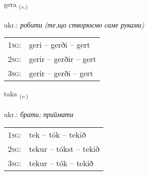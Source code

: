 \documentclass[frontgrid, backgrid]{flacards}\usepackage[]{graphicx}\usepackage[]{xcolor}
\begin{document}
\renewcommand{\flhead}{\vskip5pt \fboxsep=0pt {\small\bfseries\footnotesize Sagnorð | дієслово}}
\renewcommand{\fcfoot}{\vskip5pt \fboxsep=0pt \hspace{2pt}{\small\bfseries\footnotesize 1K}}

\renewcommand{\blhead}{\vskip5pt {\small\bfseries\footnotesize Sagnorð | дієслово }}
\renewcommand{\bcfoot}{\vskip5pt \hspace{2pt}{\small\bfseries\footnotesize 1K}}


{gera \small{\textsubscript{(\textit{v.})}} \\[1ex] %
\textphonetic{[cɛːra]} \\
ukr.: \emph{робити (те,що створюємо саме руками)} \\  [2ex]
\renewcommand*{\arraystretch}{0.8}
\begin{tabular}{p{1cm}l}
\textsc{1sg}: & geri -- gerði -- gert \\ 
\textsc{2sg}: & gerir -- gerðir -- gert \\ 
\textsc{3sg}: & gerir -- gerði -- gert \\ 
\end{tabular}
}

\renewcommand{\flhead}{\vskip5pt \fboxsep=0pt {\small\bfseries\footnotesize Sagnorð | дієслово}}
\renewcommand{\fcfoot}{\vskip5pt \fboxsep=0pt \hspace{2pt}{\small\bfseries\footnotesize 1K}}

\renewcommand{\blhead}{\vskip5pt {\small\bfseries\footnotesize Sagnorð | дієслово }}
\renewcommand{\bcfoot}{\vskip5pt \hspace{2pt}{\small\bfseries\footnotesize 1K}}


{taka \small{\textsubscript{(\textit{v.})}} \\[1ex] %
\textphonetic{[tʰaːka]} \\
ukr.: \emph{брати; приймати} \\  [2ex]
\renewcommand*{\arraystretch}{0.8}
\begin{tabular}{p{1cm}l}
\textsc{1sg}: & tek -- tók -- tekið \\ 
\textsc{2sg}: & tekur -- tókst -- tekið \\ 
\textsc{3sg}: & tekur -- tók -- tekið \\ 
\end{tabular}
}
\end{document}
